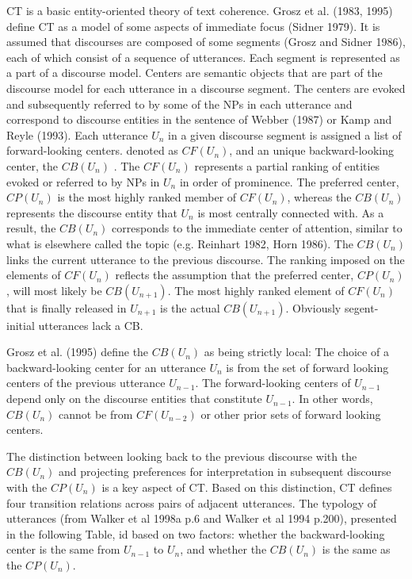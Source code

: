 CT is a basic entity-oriented theory of text coherence. 
Grosz et al. (1983, 1995) define CT as a model of some aspects of immediate focus (Sidner 1979). 
It is assumed that discourses are composed of some segments (Grosz and Sidner 1986), each of which consist of a sequence of utterances. 
Each segment is represented as a part of a discourse model. 
Centers are semantic objects that are part of the discourse model for each utterance in a discourse segment. 
The centers are evoked and subsequently referred to by some of the NPs in each utterance and correspond to discourse entities in the sentence of Webber (1987) or Kamp and Reyle (1993). 
Each utterance $U_n$ in a given discourse segment is assigned a list of forward-looking centers. 
denoted as $CF(U_n)$, and an unique backward-looking center, the $CB(U_n)$ .
The $CF(U_n)$ represents a partial ranking of entities evoked or referred to by NPs in $U_n$ in order of prominence.  
The preferred center, $CP(U_n)$ is the most highly ranked member of $CF(U_n)$, whereas the $CB(U_n)$ represents the discourse entity that $U_n$ is most centrally connected with. 
As a result, the $CB(U_n)$ corresponds to the immediate center of attention, similar to what is elsewhere called the topic (e.g. Reinhart 1982, Horn 1986). 
The $CB(U_n)$ links the current utterance to the previous discourse. 
The ranking imposed on the elements of $CF(U_n)$ reflects the assumption that the preferred center, $CP(U_n)$, will most likely be $CB(U_{n+1})$. The most highly ranked element of $CF(U_n)$ that is finally released in $U_{n+1}$ is the actual $CB(U_{n+1})$. Obviously segent-initial utterances lack a CB. 

Grosz et al. (1995) define the $CB(U_n)$ as being strictly local: The choice of a backward-looking center for an utterance $U_n$ is from the set of forward looking centers of the previous utterance $U_{n-1}$. 
The forward-looking centers of $U_{n-1}$ depend only on the discourse entities that constitute $U_{n-1}$. 
In other words, $CB(U_n)$ cannot be from $CF(U_{n-2})$ or other prior sets of forward looking centers. 

The distinction between looking back to the previous discourse with the $CB(U_n)$ and projecting preferences for interpretation in subsequent discourse with the $CP(U_n)$ is a key aspect of CT. 
Based on this distinction, CT defines four transition relations across pairs of adjacent utterances. 
The typology of utterances (from Walker et al 1998a p.6 and Walker et al 1994 p.200), presented in the following Table, id based on two factors: whether the backward-looking center is the same from $U_{n-1}$ to $U_{n}$, and whether the $CB(U_n)$ is the same as the $CP(U_n)$. 


